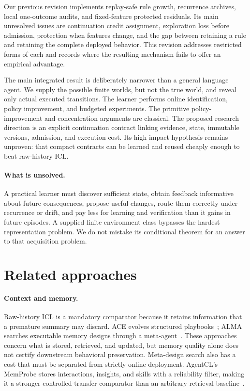 \documentclass[10pt,twocolumn]{article}
\begin{document}
Our previous revision implements replay-safe rule growth, recurrence archives,
local one-outcome audits, and fixed-feature protected residuals. Its main unresolved
issues are continuation credit assignment, exploration loss before admission,
protection when features change, and the gap between retaining a rule and retaining
the complete deployed behavior. This revision addresses restricted forms of each
and records where the resulting mechanism fails to offer an empirical advantage.

The main integrated result is deliberately narrower than a general language agent.
We supply the possible finite worlds, but not the true world, and reveal only actual
executed transitions. The learner performs online identification, policy improvement,
and budgeted experiments. The primitive policy-improvement and concentration
arguments are classical. The proposed research direction is an explicit
continuation contract linking evidence, state, immutable versions, admission,
and execution cost. Its high-impact hypothesis remains unproven: that compact
contracts can be learned and reused cheaply enough to beat raw-history ICL.

\paragraph{What is unsolved.}
A practical learner must discover sufficient state, obtain feedback informative
about future consequences, propose useful changes, route them correctly under
recurrence or drift, and pay less for learning and verification than it gains in
future episodes. A supplied finite environment class bypasses the hardest
representation problem. We do not mistake its conditional theorem for an answer
to that acquisition problem.

\section{Related approaches}
\paragraph{Context and memory.}
Raw-history ICL is a mandatory comparator because it retains information that a
premature summary may discard. ACE evolves structured playbooks~\cite{ace};
ALMA searches executable memory designs through a meta-agent~\cite{alma}.
These approaches concern what is stored, retrieved, and updated, but memory
quality alone does not certify downstream behavioral preservation. Meta-design
search also has a cost that must be separated from strictly online deployment.
AgentCL's MemProbe stores interactions, insights, and skills with a reliability
filter, making it a stronger controlled-transfer comparator than an arbitrary
retrieval baseline~\cite{agentcl}.
\end{document}
